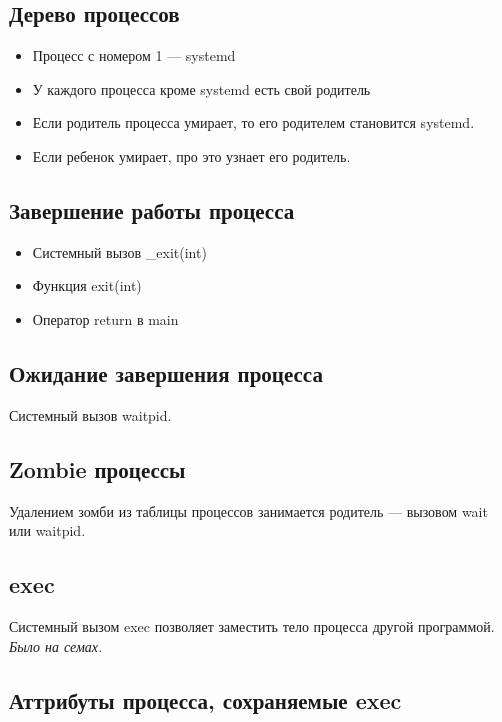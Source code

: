 \subsection{Дерево процессов}

\begin{itemize}
	\item Процесс с номером 1 --- systemd
	\item У каждого процесса кроме systemd есть свой родитель
	\item Если родитель процесса умирает, то его родителем становится systemd.
	\item Если ребенок умирает, про это узнает его родитель. 
\end{itemize}

\subsection{Завершение работы процесса}

\begin{itemize}
	\item Системный вызов \_exit(int)
	\item Функция exit(int)
	\item Оператор return в main
\end{itemize}

\subsection{Ожидание завершения процесса}

Системный вызов waitpid.

\subsection{Zombie процессы}

Удалением зомби из таблицы процессов занимается родитель --- 
вызовом wait или waitpid.

\subsection{exec}

Системный вызом exec позволяет заместить тело процесса другой программой.
\textit{Было на семах.}

\subsection{Аттрибуты процесса, сохраняемые exec}


